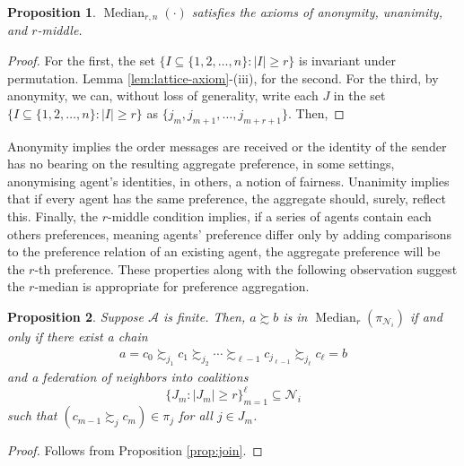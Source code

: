 \documentclass[conference]{ieeeconf}
\newcommand{\N}{\mathcal{N}}
\newcommand{\A}{\mathcal{A}}
\newcommand{\prefers}{\succsim}
\renewcommand{\geq}{\geqslant}
\DeclareMathOperator{\Median}{Median}
\newtheorem{proposition}{Proposition}
\begin{document}
\begin{proposition} \label{prop:median}
    $\Median_{r,n}(\cdot)$ satisfies the axioms of anonymity, unanimity, and $r$-middle.
\end{proposition}
\begin{proof}
    For the first, the set $\{I \subseteq \{1,2,\dots,n\}: |I| \geq r\}$ is invariant under permutation. Lemma \ref{lem:lattice-axiom}-(iii), for the second. For the third, by anonymity, we can, without loss of generality, write each $J$ in the set $\{I \subseteq \{1,2,\dots,n\}: |I| \geq r\}$ as $\{j_m,j_{m+1},\dots,j_{m+r+1}\}$. Then, 
\end{proof}

Anonymity implies the order messages are received or the identity of the sender has no bearing on the resulting aggregate preference, in some settings, anonymising agent's identities, in others, a notion of fairness. Unanimity implies that if every agent has the same preference, the aggregate should, surely, reflect this. Finally, the $r$-middle condition implies, if a series of agents contain each others preferences, meaning agents' preference differ only by adding comparisons to the preference relation of an existing agent, the aggregate preference will be the $r$-th preference. These properties along with the following observation suggest the $r$-median is appropriate for preference aggregation.

\begin{proposition} \label{prop:median-chain}
    Suppose $\A$ is finite. Then, $a \prefers b$ is in $\Median_r(\pi_{\N_i})$ if and only if there exist a chain
    \begin{align*}
        a = c_0 \prefers_{j_1} c_1 \prefers_{j_2} \cdots \prefers_{\ell-1} c_{j_{\ell-1}} \prefers_{j_\ell} c_{\ell} = b
    \end{align*}
    and a federation of neighbors into coalitions \[\{ J_m : |J_m| \geq r \}_{m=1}^{\ell} \subseteq \N_i\] such that $(c_{m-1} \prefers_{j} c_{m}) \in \pi_j$ for all  $j \in J_m$.
\end{proposition}
\begin{proof}
    Follows from Proposition \ref{prop:join}.
\end{proof}
\end{document}
